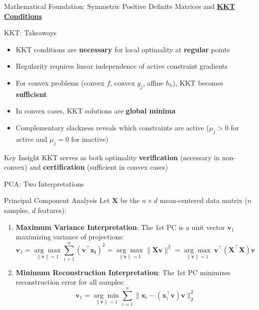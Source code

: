\documentclass{beamer}
\begin{document}
\begin{frame}{{Mathematical Foundation: Symmetric Positive Definite Matrices and \textbf{\underline{KKT Conditions}}}}
    \begin{block}{KKT: Takeaways}
        \begin{itemize}
            \item KKT conditions are \textbf{necessary} for local optimality at \textbf{regular} points
            \item Regularity requires linear independence of active constraint gradients
            \item For convex problems (convex $f$, convex $g_j$, affine $h_k$), KKT becomes \textbf{sufficient}
            \item In convex cases, KKT solutions are \textbf{global minima}
            \item Complementary slackness reveals which constraints are active ($\mu_j > 0$ for active and $\mu_j = 0$ for inactive)
        \end{itemize}
    \end{block}

    \begin{alertblock}{Key Insight}
        KKT serves as both optimality \textbf{verification} (necessary in non-convex) and \textbf{certification} (sufficient in convex cases)
    \end{alertblock}
\end{frame}


\begin{frame}{PCA: Two Interpretations}
    \begin{block}{Principal Component Analysis}
        Let $\mathbf{X}$ be the $n \times d$ mean-centered data matrix ($n$ samples, $d$ features):
        
        \begin{enumerate}
            \item \textbf{Maximum Variance Interpretation}:
            The 1st PC is a unit vector $\mathbf{v}_1$ maximizing variance of projections:
            \[
             \mathbf{v}_1 = \underset{\|\mathbf{v}\|=1}{\arg\max} \sum_{i = 1}^n (\mathbf{v}^\top \mathbf{x_i})^2 =  \underset{\|\mathbf{v}\|=1}{\arg\max} \|\mathbf{X}\mathbf{v}\|^2 = \underset{\|\mathbf{v}\|=1}{\arg\max}\ \mathbf{v}^\top (\mathbf{X}^\top \mathbf{X}) \mathbf{v}
            \]
            
            \item \textbf{Minimum Reconstruction Interpretation}:
            The 1st PC minimizes reconstruction error for all samples:
            \[
            \mathbf{v}_1 = \underset{\|\mathbf{v}\|=1}{\arg\min} \sum_{i=1}^n \|\mathbf{x}_i - (\mathbf{x}_i^\top \mathbf{v})\mathbf{v}\|_2^2
            \]
        \end{enumerate}
    \end{block}
\end{frame}
\end{document}
